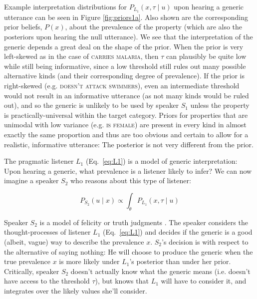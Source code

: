 \documentclass{pnastwo}
\begin{document}
\begin{article}
Example interpretation distributions for $P_{L_{1}}(x , \tau \mid u)$ upon hearing a generic utterance can be seen in Figure \ref{fig:priors1a}. 
Also shown are the corresponding prior beliefs, $P(x)$, about the prevalence of the property (which are also the posteriors upon hearing the null utterance).
We see that the interpretation of the generic depends a great deal on the shape of the prior.
When the prior is very left-skewed as in the case of \textsc{carries malaria}, then $\tau$ can plausibly be quite low while still being informative, since a low threshold still rules out many possible alternative kinds (and their corresponding degree of prevalence).
If the prior is right-skewed (e.g. \textsc{doesn't attack swimmers}), even an intermediate threshold would not result in an informative utterance (as not many kinds would be ruled out), and so the generic is unlikely to be used by speaker $S_1$ unless the property is practically-universal within the target category. 
Priors for properties that are unimodal with low variance (e.g. \textsc{is female}) are present in every kind in almost exactly the same proportion and thus are too obvious and certain to allow for a realistic, informative utterance: The posterior is not very different from the prior. 

The pragmatic listener $L_1$ (Eq.~\ref{eq:L1}) is a model of generic interpretation: Upon hearing a generic, what prevalence is a listener likely to infer?
We can now imagine a speaker $S_2$ who reasons about this type of listener: 

\begin{equation} 
P_{S_{2}}(u \mid x) \propto  \int_{\theta} P_{L_{1}}(x , \tau \mid u) %
\label{eq:S2}
\end{equation}

Speaker $S_2$ is a model of felicity or truth judgments \cite{Degen2014}.
The speaker considers the thought-processes of listener $L_1$ (Eq.~\ref{eq:L1}) and decides if the generic is a good (albeit, vague) way to describe the prevalence $x$. 
$S_2$'s decision is with respect to the alternative of saying nothing: He will choose to produce the generic when the true prevalence $x$ is more likely under $L_1$'s posterior than under her prior. 
Critically, speaker $S_{2}$ doesn't actually know what the generic means (i.e. doesn't have access to the threshold $\tau$), but knows that $L_{1}$ will have to consider it, and integrates over the likely values she'll consider.



\end{article}
\end{document}
